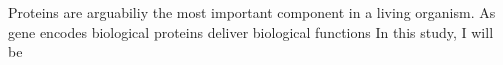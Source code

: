 Proteins are arguabiliy the most important component in a living organism. As gene encodes biological  proteins deliver biological functions   In this study, I will be 